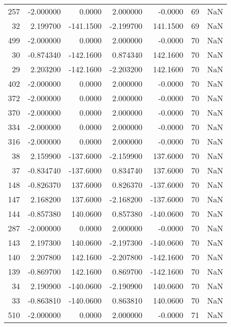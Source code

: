 \begin{tabular}{rrrrrrr}
257 &   -2.000000 &    0.0000 &    2.000000 &     -0.0000 &          69 & NaN \\
 32 &    2.199700 & -141.1500 &   -2.199700 &    141.1500 &          69 & NaN \\
499 &   -2.000000 &    0.0000 &    2.000000 &     -0.0000 &          70 & NaN \\
 30 &   -0.874340 & -142.1600 &    0.874340 &    142.1600 &          70 & NaN \\
 29 &    2.203200 & -142.1600 &   -2.203200 &    142.1600 &          70 & NaN \\
402 &   -2.000000 &    0.0000 &    2.000000 &     -0.0000 &          70 & NaN \\
372 &   -2.000000 &    0.0000 &    2.000000 &     -0.0000 &          70 & NaN \\
370 &   -2.000000 &    0.0000 &    2.000000 &     -0.0000 &          70 & NaN \\
334 &   -2.000000 &    0.0000 &    2.000000 &     -0.0000 &          70 & NaN \\
316 &   -2.000000 &    0.0000 &    2.000000 &     -0.0000 &          70 & NaN \\
 38 &    2.159900 & -137.6000 &   -2.159900 &    137.6000 &          70 & NaN \\
 37 &   -0.834740 & -137.6000 &    0.834740 &    137.6000 &          70 & NaN \\
148 &   -0.826370 &  137.6000 &    0.826370 &   -137.6000 &          70 & NaN \\
147 &    2.168200 &  137.6000 &   -2.168200 &   -137.6000 &          70 & NaN \\
144 &   -0.857380 &  140.0600 &    0.857380 &   -140.0600 &          70 & NaN \\
287 &   -2.000000 &    0.0000 &    2.000000 &     -0.0000 &          70 & NaN \\
143 &    2.197300 &  140.0600 &   -2.197300 &   -140.0600 &          70 & NaN \\
140 &    2.207800 &  142.1600 &   -2.207800 &   -142.1600 &          70 & NaN \\
139 &   -0.869700 &  142.1600 &    0.869700 &   -142.1600 &          70 & NaN \\
 34 &    2.190900 & -140.0600 &   -2.190900 &    140.0600 &          70 & NaN \\
 33 &   -0.863810 & -140.0600 &    0.863810 &    140.0600 &          70 & NaN \\
510 &   -2.000000 &    0.0000 &    2.000000 &     -0.0000 &          71 & NaN \\

\end{tabular}
